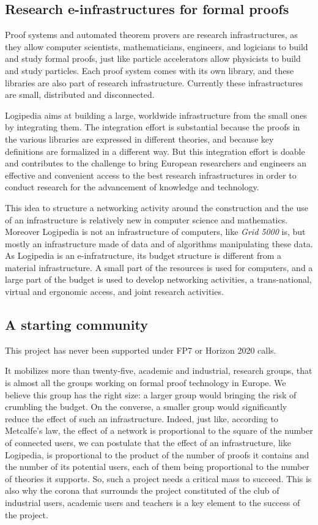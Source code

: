 \subsection{Research e-infrastructures for formal proofs}

Proof systems and automated theorem provers are research
infrastructures, as they allow computer scientists, mathematicians,
engineers, and logicians to build and study formal proofs, just like
particle accelerators allow physicists to build and study
particles. Each proof system comes with its own library, and these
libraries are also part of research infrastructure.  Currently these
infrastructures are small, distributed and disconnected.

{\sf Logipedia} aims at building a large, worldwide infrastructure
from the small ones by integrating them.  The integration effort is
substantial because the proofs in the various libraries are expressed
in different theories, and because key definitions are formalized in a
different way.  But this integration effort is doable and contributes
to the challenge to bring European researchers and engineers an
effective and convenient access to the best research infrastructures
in order to conduct research for the advancement of knowledge and
technology.

This idea to structure a networking activity around the construction
and the use of an infrastructure is relatively new in computer science
and mathematics. Moreover {\sf Logipedia} is not an infrastructure of
computers, like {\em Grid 5000} is, but mostly an infrastructure made
of data and of algorithms manipulating these data.  As {\sf Logipedia}
is an e-infratructure, its budget structure is different from a
material infrastructure. A small part of the resources is used for
computers, and a large part of the budget is used to develop
networking activities, a trans-national, virtual and ergonomic access,
and joint research activities.


\subsection{A starting community}

This project has never been supported under FP7 or Horizon 2020 calls.

It mobilizes more than twenty-five, academic and industrial, research
groups, that is almost all the groups working on formal proof
technology in Europe. We believe this group has the right size: a
larger group would bringing the risk of crumbling the budget.  On the
converse, a smaller group would significantly reduce the effect of
such an infrastructure. Indeed, just like, according to Metcalfe's
law, the effect of a network is proportional to the square of the
number of connected users, we can postulate that the effect of an
infrastructure, like {\sf Logipedia}, is proportional to the product
of the number of proofs it contains and the number of its potential
users, each of them being proportional to the number of theories it
supports. So, such a project needs a critical mass to succeed. This is
also why the corona that surrounds the project constituted of the club
of industrial users, academic users and teachers is a key element to
the success of the project.

